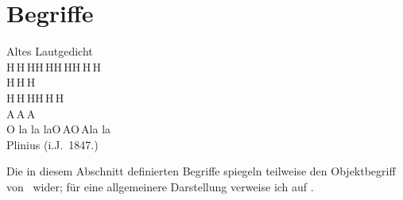 \section{Begriffe}
%
\vspace*{-4.5ex}\begin{fortune}[6cm]
\rm\hspace*{\fill}Altes Lautgedicht\hspace*{\fill}\\[\smallskipamount]
\sf%
H\,H\,H\hspace*{\fill}H\,H\hspace*{\fill}H\,H\hspace*{\fill}H\,H\,H\\
\hspace*{\fill}H\,H\,H\hspace*{\fill}\\
\hspace*{\fill}H\,H\,H\hspace*{\fill}H\,H\,H\hspace*{\fill}\\
\hspace*{\fill}A\,A\,A\hspace*{\fill}\\
O la la la\hspace*{\fill}O\,A\hspace*{\fill}O\,A\hspace*{\fill}la la%
\\[\smallskipamount]
\rm{}Plinius (i.J.\ 1847.)
\end{fortune}
%
Die in diesem Abschnitt definierten Begriffe spiegeln teilweise den
Objektbegriff von \clos\ wider; f\"{u}r eine allgemeinere Darstellung
verweise ich auf
\cite{bib:we90}.
%
